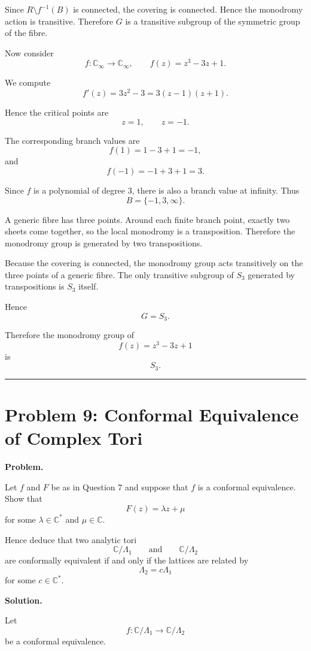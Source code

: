 \documentclass[12pt,a4paper]{article}
\theoremstyle{notespace}
\begin{document}
Since \(R\setminus f^{-1}(B)\) is connected, the covering is connected.
Hence the monodromy action is transitive. Therefore \(G\) is a
transitive subgroup of the symmetric group of the fibre.

Now consider
\[
f:\mathbb C_\infty\to\mathbb C_\infty,
\qquad
f(z)=z^3-3z+1.
\]

We compute
\[
f'(z)=3z^2-3=3(z-1)(z+1).
\]

Hence the critical points are
\[
z=1,
\qquad
z=-1.
\]

The corresponding branch values are
\[
f(1)=1-3+1=-1,
\]
and
\[
f(-1)=-1+3+1=3.
\]

Since \(f\) is a polynomial of degree \(3\), there is also a branch value
at infinity. Thus
\[
B=\{-1,3,\infty\}.
\]

A generic fibre has three points. Around each finite branch point,
exactly two sheets come together, so the local monodromy is a
transposition. Therefore the monodromy group is generated by two
transpositions.

Because the covering is connected, the monodromy group acts transitively
on the three points of a generic fibre. The only transitive subgroup of
\(S_3\) generated by transpositions is \(S_3\) itself.

Hence
\[
G=S_3.
\]

Therefore the monodromy group of
\[
f(z)=z^3-3z+1
\]
is
\[
\boxed{S_3}.
\]

\bigskip

\hrule

\bigskip

\section{Problem 9: Conformal Equivalence of Complex Tori}

\textbf{Problem.}

Let \(f\) and \(F\) be as in Question 7 and suppose that \(f\) is a
conformal equivalence. Show that
\[
F(z)=\lambda z+\mu
\]
for some \(\lambda\in\mathbb C^*\) and \(\mu\in\mathbb C\).

Hence deduce that two analytic tori
\[
\mathbb C/\Lambda_1
\qquad\text{and}\qquad
\mathbb C/\Lambda_2
\]
are conformally equivalent if and only if the lattices are related by
\[
\Lambda_2=c\Lambda_1
\]
for some \(c\in\mathbb C^*\).

\bigskip

\textbf{Solution.}

Let
\[
f:\mathbb C/\Lambda_1\longrightarrow \mathbb C/\Lambda_2
\]
be a conformal equivalence.
\end{document}
